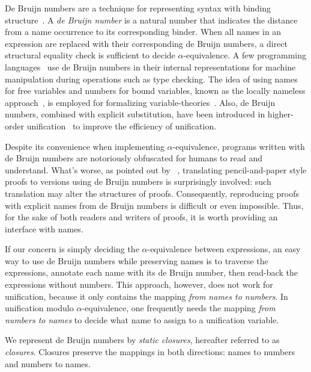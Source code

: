 \documentclass[a4paper,UKenglish]{lipics-v2016}
\begin{document}
De Bruijn numbers are a technique for representing syntax with binding
structure~\citep{de_bruijn_lambda_1972}.  A \emph{de Bruijn number} is
a natural number that indicates the distance from a name occurrence to
its corresponding binder.  When all names in an expression are
replaced with their corresponding de Bruijn numbers, a direct
structural equality check is sufficient to decide
$\alpha$-equivalence.  A few programming
languages~\citep{norell_towards_2007} use de Bruijn numbers in their
internal representations for machine manipulation during operations
such as type checking.  The idea of using names for free variables and
numbers for bound variables, known as the locally nameless
approach~\citep{chargueraud_locally_2012}, is employed for formalizing
variable-theories~\citep{aydemir_nominal_2006,
  aydemir_engineering_2008}.  Also, de Bruijn numbers, combined with
explicit substitution, have been introduced in higher-order
unification~\citep{dowek_higher_2000} to improve the efficiency of
unification.

Despite its convenience when implementing $\alpha$-equivalence,
programs written with de Bruijn numbers are notoriously obfuscated for
humans to read and understand.  What's worse, as pointed out by
~\citet{berghofer_head--head_2007}, translating
pencil-and-paper style proofs to versions using de Bruijn numbers is
surprisingly involved: such translation may alter the structures of
proofs.  Consequently, reproducing proofs with explicit names from de
Bruijn numbers is difficult or even impossible.  Thus, for the sake of
both readers and writers of proofs, it is worth providing an interface
with names.

If our concern is simply deciding the $\alpha$-equivalence between
expressions, an easy way to use de Bruijn numbers while preserving
names is to traverse the expressions, annotate each name with its de
Bruijn number, then read-back the expressions without numbers.  This
approach, however, does not work for unification, because it only
contains the mapping \emph{from names to numbers}.  In unification
modulo $\alpha$-equivalence, one frequently needs the mapping
\emph{from numbers to names} to decide what name to assign to a
unification variable.

We represent de Bruijn numbers by \emph{static closures},
hereafter referred to as \emph{closures}.  Closures preserve the
mappings in both directions: names to numbers and numbers to names.
\end{document}
